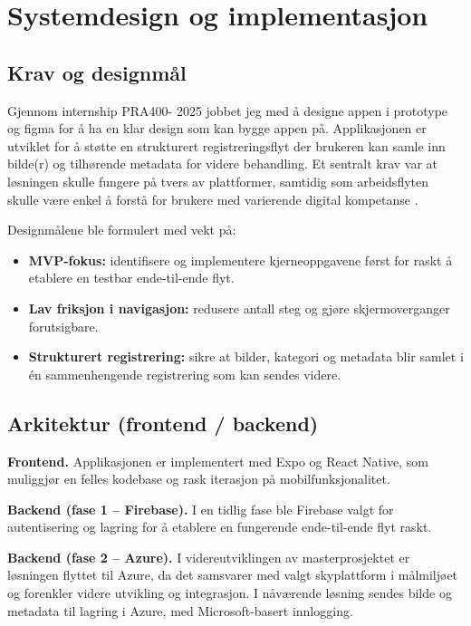 \chapter{Systemdesign og implementasjon}
\label{chap:system}

\section{Krav og designmål}
\label{sec:krav-designmal}
Gjennom internship PRA400- 2025 jobbet jeg med å designe appen i prototype og figma for å ha en klar design som kan bygge appen på. 
Applikasjonen er utviklet for å støtte en strukturert registreringsflyt der brukeren kan samle inn bilde(r) og tilhørende metadata for videre behandling. Et sentralt krav var at løsningen skulle fungere på tvers av plattformer, samtidig som arbeidsflyten skulle være enkel å forstå for brukere med varierende digital kompetanse \cite{stellai_projectdoc_2025}.

Designmålene ble formulert med vekt på:
\begin{itemize}
  \item \textbf{MVP-fokus:} identifisere og implementere kjerneoppgavene først for raskt å etablere en testbar ende-til-ende flyt.
  \item \textbf{Lav friksjon i navigasjon:} redusere antall steg og gjøre skjermoverganger forutsigbare.
  \item \textbf{Strukturert registrering:} sikre at bilder, kategori og metadata blir samlet i én sammenhengende registrering som kan sendes videre.
\end{itemize}

\section{Arkitektur (frontend / backend)}
\label{sec:arkitektur}
\textbf{Frontend.} Applikasjonen er implementert med Expo og React Native, som muliggjør en felles kodebase og rask iterasjon på mobilfunksjonalitet.

\textbf{Backend (fase 1 -- Firebase).} I en tidlig fase ble Firebase valgt for autentisering og lagring for å etablere en fungerende ende-til-ende flyt raskt.

\textbf{Backend (fase 2 -- Azure).} I videreutviklingen av masterprosjektet er løsningen flyttet til Azure, da det samsvarer med valgt skyplattform i målmiljøet og forenkler videre utvikling og integrasjon. I nåværende løsning sendes bilde og metadata til lagring i Azure, med Microsoft-basert innlogging.

